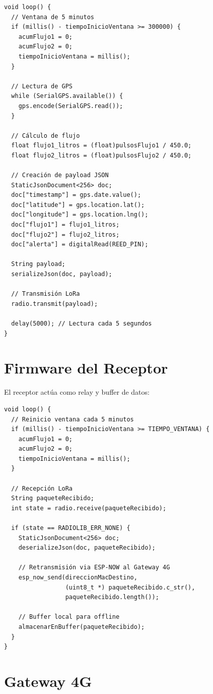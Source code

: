 \documentclass[12pt,a4paper,oneside]{report}
\begin{document}
\begin{lstlisting}
void loop() {
  // Ventana de 5 minutos
  if (millis() - tiempoInicioVentana >= 300000) {
    acumFlujo1 = 0;
    acumFlujo2 = 0;
    tiempoInicioVentana = millis();
  }
  
  // Lectura de GPS
  while (SerialGPS.available()) {
    gps.encode(SerialGPS.read());
  }
  
  // Cálculo de flujo
  float flujo1_litros = (float)pulsosFlujo1 / 450.0;
  float flujo2_litros = (float)pulsosFlujo2 / 450.0;
  
  // Creación de payload JSON
  StaticJsonDocument<256> doc;
  doc["timestamp"] = gps.date.value();
  doc["latitude"] = gps.location.lat();
  doc["longitude"] = gps.location.lng();
  doc["flujo1"] = flujo1_litros;
  doc["flujo2"] = flujo2_litros;
  doc["alerta"] = digitalRead(REED_PIN);
  
  String payload;
  serializeJson(doc, payload);
  
  // Transmisión LoRa
  radio.transmit(payload);
  
  delay(5000); // Lectura cada 5 segundos
}
\end{lstlisting}

\section{Firmware del Receptor}

El receptor actúa como relay y buffer de datos:

\begin{lstlisting}
void loop() {
  // Reinicio ventana cada 5 minutos
  if (millis() - tiempoInicioVentana >= TIEMPO_VENTANA) {
    acumFlujo1 = 0;
    acumFlujo2 = 0;
    tiempoInicioVentana = millis();
  }
  
  // Recepción LoRa
  String paqueteRecibido;
  int state = radio.receive(paqueteRecibido);
  
  if (state == RADIOLIB_ERR_NONE) {
    StaticJsonDocument<256> doc;
    deserializeJson(doc, paqueteRecibido);
    
    // Retransmisión via ESP-NOW al Gateway 4G
    esp_now_send(direccionMacDestino, 
                 (uint8_t *) paqueteRecibido.c_str(), 
                 paqueteRecibido.length());
    
    // Buffer local para offline
    almacenarEnBuffer(paqueteRecibido);
  }
}
\end{lstlisting}

\section{Gateway 4G}
\end{document}
